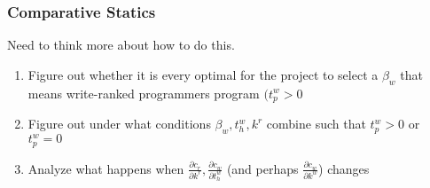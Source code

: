\documentclass[12pt,notitlepage]{article}
\begin{document}
\subsubsection{Comparative Statics}
    Need to think more about how to do this.
    \begin{enumerate}
        \item Figure out whether it is every optimal for the project to select a $\beta_w$ that means write-ranked programmers program $(t_p^w > 0$
        \item Figure out under what conditions $\beta_w, t_h^w, k^r$ combine such that $t_p^w > 0$ or $t_p^w = 0$
        \item Analyze what happens when $\frac{\partial c_r}{\partial k^r}, \frac{\partial c_w}{\partial t_h^w}$ (and perhaps $\frac{\partial c_w}{\partial k^w}$) changes
        
    \end{enumerate}
    
\end{document}
